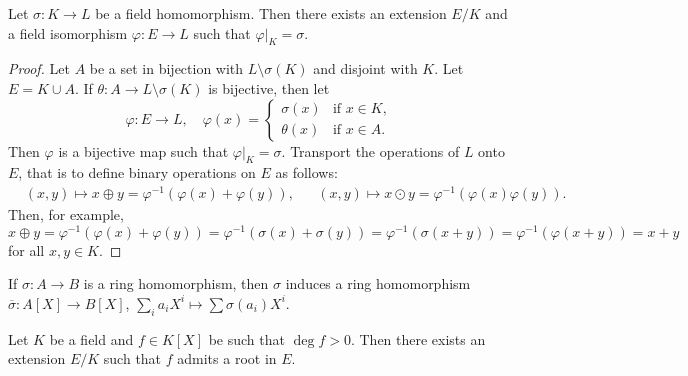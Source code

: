 
\begin{lemma}
	Let $\sigma\colon K\to L$ be a field homomorphism. Then there exists an extension
	$E/K$ and a field isomorphism $\varphi\colon E\to L$
	such that $\varphi|_K=\sigma$. 
\end{lemma}

\begin{proof}
	Let $A$ be a set in bijection with $L\setminus\sigma(K)$ and disjoint with $K$. 
	Let $E=K\cup A$. If $\theta\colon A\to L\setminus\sigma(K)$ is bijective, then 
	let 
	\[
		\varphi\colon E\to L,
		\quad
		\varphi(x)=\begin{cases}
			\sigma(x) & \text{if $x\in K$},\\
			\theta(x) & \text{if $x\in A$}.
		\end{cases}
	\]
	Then $\varphi$ is a bijective map such that $\varphi|_K=\sigma$. 
	Transport the operations of $L$ onto $E$, that is 
	to define binary operations on $E$ as follows: 
	\begin{align*}
		&(x,y)\mapsto x\oplus y=\varphi^{-1}(\varphi(x)+\varphi(y)), && 
		(x,y)\mapsto x\odot y=\varphi^{-1}(\varphi(x)\varphi(y)).
	\end{align*}
	Then, for example, 
	\[
		x\oplus y=\varphi^{-1}(\varphi(x)+\varphi(y))=\varphi^{-1}(\sigma(x)+\sigma(y))
		=\varphi^{-1}(\sigma(x+y))=\varphi^{-1}(\varphi(x+y))=x+y
	\]
	for all $x,y\in K$. 
\end{proof}

If $\sigma\colon A\to B$ is a ring homomorphism, then $\sigma$ induces a ring
homomorphism $\overline{\sigma}\colon A[X]\to B[X]$,
$\sum_ia_iX^i\mapsto\sum\sigma(a_i)X^i$. 

\begin{theorem}
	Let $K$ be a field and $f\in K[X]$ be such that $\deg f>0$. Then 
	there exists an extension $E/K$ such that $f$ admits a root in $E$. 
\end{theorem}

